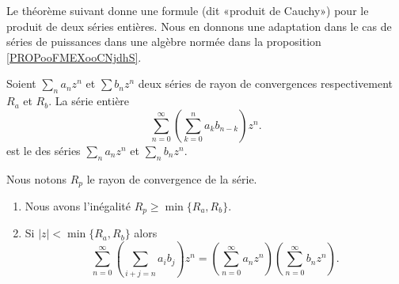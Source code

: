 Le théorème suivant donne une formule (dit «produit de Cauchy») pour le produit de deux séries entières. Nous en donnons une adaptation dans le cas de séries de puissances dans une algèbre normée dans la proposition \ref{PROPooFMEXooCNjdhS}.
\begin{theoremDef}     \label{ThokPTXYC}
	Soient \( \sum_na_nz^n\) et \( \sum b_nz^n\) deux séries de rayon de convergences respectivement \( R_a\) et \( R_b\). La série entière
	\begin{equation}        \label{EqFPGGooDQlXGe}
		\sum_{n=0}^{\infty}\left( \sum_{k=0}^{n}a_kb_{n-k} \right)z^n.
	\end{equation}
	est le  des séries \( \sum_na_nz^n\) et \( \sum_nb_nz^n\).

	Nous notons \( R_p\) le rayon de convergence de la série.
	\begin{enumerate}
		\item   \label{ITEMooFOVPooBaVknN}
		      Nous avons l'inégalité \( R_p\geq \min\{ R_a,R_b \}\).
		\item   \label{ITEMooHRNZooWviigD}
		      Si \( | z |<\min\{ R_a,R_b \}\) alors
		      \begin{equation}        \label{EQooSGXHooHwjOEV}
			      \sum_{n=0}^{\infty}\left( \sum_{i+j=n}a_ib_j \right)z^n=\left( \sum_{n=0}^{\infty}a_nz^n \right)\left( \sum_{n=0}^{\infty}b_nz^n \right).
		      \end{equation}
	\end{enumerate}
\end{theoremDef}

